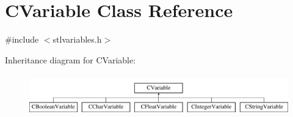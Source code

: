 \hypertarget{classCVariable}{\section{C\-Variable Class Reference}
\label{classCVariable}
}


{\ttfamily \#include $<$stlvariables.\-h$>$}

Inheritance diagram for C\-Variable\-:\begin{figure}[H]
\begin{center}
\leavevmode
\includegraphics[height=1.821138cm]{d2/d62/classCVariable}
\end{center}
\end{figure}
